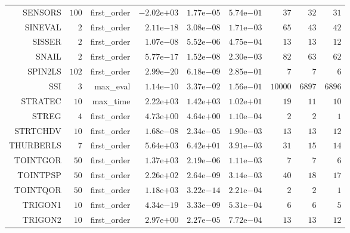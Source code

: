 \begin{longtable}{rrrrrrrrr}
SENSORS & \(   100\) & first\_order & \(-2.02\)e\(+03\) & \( 1.77\)e\(-05\) & \( 5.74\)e\(-01\) & \(    37\) & \(    32\) & \(    31\) \\
SINEVAL & \(     2\) & first\_order & \( 2.11\)e\(-18\) & \( 3.08\)e\(-08\) & \( 1.71\)e\(-03\) & \(    65\) & \(    43\) & \(    42\) \\
SISSER & \(     2\) & first\_order & \( 1.07\)e\(-08\) & \( 5.52\)e\(-06\) & \( 4.75\)e\(-04\) & \(    13\) & \(    13\) & \(    12\) \\
SNAIL & \(     2\) & first\_order & \( 5.77\)e\(-17\) & \( 1.52\)e\(-08\) & \( 2.30\)e\(-03\) & \(    82\) & \(    63\) & \(    62\) \\
SPIN2LS & \(   102\) & first\_order & \( 2.99\)e\(-20\) & \( 6.18\)e\(-09\) & \( 2.85\)e\(-01\) & \(     7\) & \(     7\) & \(     6\) \\
SSI & \(     3\) & max\_eval & \( 1.14\)e\(-10\) & \( 3.37\)e\(-02\) & \( 1.56\)e\(-01\) & \( 10000\) & \(  6897\) & \(  6896\) \\
STRATEC & \(    10\) & max\_time & \( 2.22\)e\(+03\) & \( 1.42\)e\(+03\) & \( 1.02\)e\(+01\) & \(    19\) & \(    11\) & \(    10\) \\
STREG & \(     4\) & first\_order & \( 4.73\)e\(+00\) & \( 4.64\)e\(+00\) & \( 1.10\)e\(-04\) & \(     2\) & \(     2\) & \(     1\) \\
STRTCHDV & \(    10\) & first\_order & \( 1.68\)e\(-08\) & \( 2.34\)e\(-05\) & \( 1.90\)e\(-03\) & \(    13\) & \(    13\) & \(    12\) \\
THURBERLS & \(     7\) & first\_order & \( 5.64\)e\(+03\) & \( 6.42\)e\(+01\) & \( 3.91\)e\(-03\) & \(    31\) & \(    15\) & \(    14\) \\
TOINTGOR & \(    50\) & first\_order & \( 1.37\)e\(+03\) & \( 2.19\)e\(-06\) & \( 1.11\)e\(-03\) & \(     7\) & \(     7\) & \(     6\) \\
TOINTPSP & \(    50\) & first\_order & \( 2.26\)e\(+02\) & \( 2.64\)e\(-09\) & \( 3.14\)e\(-03\) & \(    40\) & \(    18\) & \(    17\) \\
TOINTQOR & \(    50\) & first\_order & \( 1.18\)e\(+03\) & \( 3.22\)e\(-14\) & \( 2.21\)e\(-04\) & \(     2\) & \(     2\) & \(     1\) \\
TRIGON1 & \(    10\) & first\_order & \( 4.34\)e\(-19\) & \( 3.33\)e\(-09\) & \( 5.31\)e\(-04\) & \(     6\) & \(     6\) & \(     5\) \\
TRIGON2 & \(    10\) & first\_order & \( 2.97\)e\(+00\) & \( 2.27\)e\(-05\) & \( 7.72\)e\(-04\) & \(    13\) & \(    13\) & \(    12\) \\

\end{longtable}
